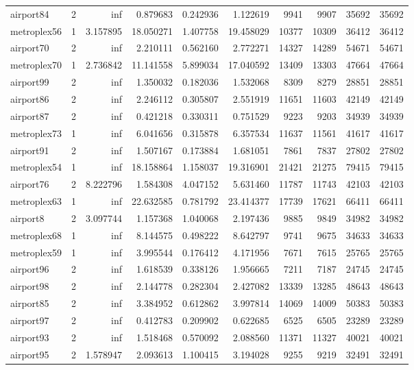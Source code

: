 \begin{longtable}{|l|r|r|r|r|r|r|r|r|r|}
airport84 & 2 & inf & 0.879683 & 0.242936 & 1.122619 & 9941 & 9907 & 35692 & 35692 \\
metroplex56 & 1 & 3.157895 & 18.050271 & 1.407758 & 19.458029 & 10377 & 10309 & 36412 & 36412 \\
airport70 & 2 & inf & 2.210111 & 0.562160 & 2.772271 & 14327 & 14289 & 54671 & 54671 \\
metroplex70 & 1 & 2.736842 & 11.141558 & 5.899034 & 17.040592 & 13409 & 13303 & 47664 & 47664 \\
airport99 & 2 & inf & 1.350032 & 0.182036 & 1.532068 & 8309 & 8279 & 28851 & 28851 \\
airport86 & 2 & inf & 2.246112 & 0.305807 & 2.551919 & 11651 & 11603 & 42149 & 42149 \\
airport87 & 2 & inf & 0.421218 & 0.330311 & 0.751529 & 9223 & 9203 & 34939 & 34939 \\
metroplex73 & 1 & inf & 6.041656 & 0.315878 & 6.357534 & 11637 & 11561 & 41617 & 41617 \\
airport91 & 2 & inf & 1.507167 & 0.173884 & 1.681051 & 7861 & 7837 & 27802 & 27802 \\
metroplex54 & 1 & inf & 18.158864 & 1.158037 & 19.316901 & 21421 & 21275 & 79415 & 79415 \\
airport76 & 2 & 8.222796 & 1.584308 & 4.047152 & 5.631460 & 11787 & 11743 & 42103 & 42103 \\
metroplex63 & 1 & inf & 22.632585 & 0.781792 & 23.414377 & 17739 & 17621 & 66411 & 66411 \\
airport8 & 2 & 3.097744 & 1.157368 & 1.040068 & 2.197436 & 9885 & 9849 & 34982 & 34982 \\
metroplex68 & 1 & inf & 8.144575 & 0.498222 & 8.642797 & 9741 & 9675 & 34633 & 34633 \\
metroplex59 & 1 & inf & 3.995544 & 0.176412 & 4.171956 & 7671 & 7615 & 25765 & 25765 \\
airport96 & 2 & inf & 1.618539 & 0.338126 & 1.956665 & 7211 & 7187 & 24745 & 24745 \\
airport98 & 2 & inf & 2.144778 & 0.282304 & 2.427082 & 13339 & 13285 & 48643 & 48643 \\
airport85 & 2 & inf & 3.384952 & 0.612862 & 3.997814 & 14069 & 14009 & 50383 & 50383 \\
airport97 & 2 & inf & 0.412783 & 0.209902 & 0.622685 & 6525 & 6505 & 23289 & 23289 \\
airport93 & 2 & inf & 1.518468 & 0.570092 & 2.088560 & 11371 & 11327 & 40021 & 40021 \\
airport95 & 2 & 1.578947 & 2.093613 & 1.100415 & 3.194028 & 9255 & 9219 & 32491 & 32491 \\

\end{longtable}
